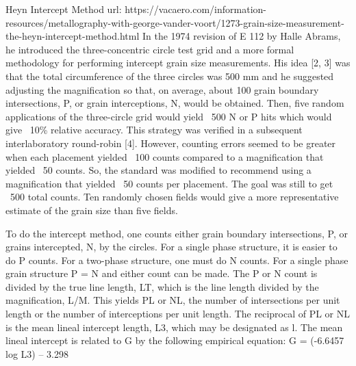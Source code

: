 \documentclass[10pt]{beamer}
\begin{document}
{%
\begin{frame}[fragile]{Heyn Intercept Method}
url: https://vacaero.com/information-resources/metallography-with-george-vander-voort/1273-grain-size-measurement-the-heyn-intercept-method.html
In the 1974 revision of E 112 by Halle Abrams, he introduced the three-concentric circle test grid and a more formal methodology for performing intercept grain size measurements. His idea [2, 3] was that the total circumference of the three circles was 500 mm and he suggested adjusting the magnification so that, on average, about 100 grain boundary intersections, P, or grain interceptions, N, would be obtained. Then, five random applications of the three-circle grid would yield ~500 N or P hits which would give ~10\% relative accuracy. This strategy was verified in a subsequent interlaboratory round-robin [4]. However, counting errors seemed to be greater when each placement yielded ~100 counts compared to a magnification that yielded ~50 counts. So, the standard was modified to recommend using a magnification that yielded ~50 counts per placement. The goal was still to get ~500 total counts. Ten randomly chosen fields would give a more representative estimate of the grain size than five fields.

To do the intercept method, one counts either grain boundary intersections, P, or grains intercepted, N, by the circles. For a single phase structure, it is easier to do P counts. For a two-phase structure, one must do N counts. For a single phase grain structure P = N and either count can be made. The P or N count is divided by the true line length, LT, which is the line length divided by the magnification, L/M. This yields PL or NL, the number of intersections per unit length or the number of interceptions per unit length. The reciprocal of PL or NL is the mean lineal intercept length, L3, which may be designated as l. The mean lineal intercept is related to G by the following empirical equation:
							G = (-6.6457 log L3)  – 3.298      
							

\end{frame}}
\end{document}
